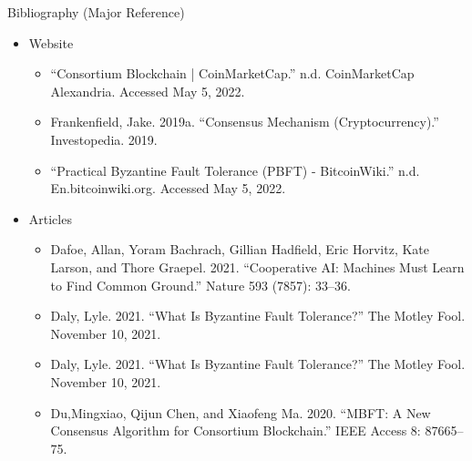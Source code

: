 \documentclass{beamer}
\begin{document}
	\begin{frame}{Bibliography (Major Reference)}
		\begin{itemize}
			\item Website
			\begin{itemize}
				\item  “Consortium Blockchain | CoinMarketCap.” n.d. CoinMarketCap Alexandria. Accessed May 5, 2022.
				\item Frankenfield, Jake. 2019a. “Consensus Mechanism (Cryptocurrency).” Investopedia. 2019.
				\item “Practical Byzantine Fault Tolerance (PBFT) - BitcoinWiki.” n.d. En.bitcoinwiki.org. Accessed May 5, 2022.
			\end{itemize}
			\item Articles
			\begin{itemize}
				\item Dafoe, Allan, Yoram Bachrach, Gillian Hadfield, Eric Horvitz, Kate Larson, and Thore Graepel. 2021. “Cooperative AI: Machines Must Learn to Find Common Ground.” Nature 593 (7857): 33–36.
				\item Daly, Lyle. 2021. “What Is Byzantine Fault Tolerance?” The Motley Fool. November 10, 2021.
				\item Daly, Lyle. 2021. “What Is Byzantine Fault Tolerance?” The Motley Fool. November 10, 2021.
		\item Du,Mingxiao, Qijun Chen, and Xiaofeng Ma. 2020. “MBFT: A New Consensus Algorithm for Consortium Blockchain.” IEEE Access 8: 87665–75.	\end{itemize}
		\end{itemize}
		
	\end{frame}


%		
%			
%				
\end{document}
